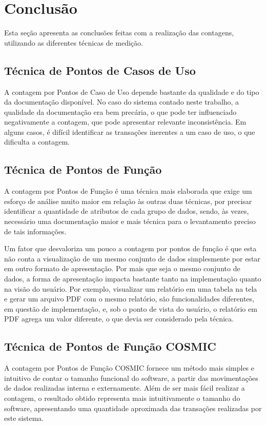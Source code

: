 \chapter{Conclusão}

  Esta seção apresenta as conclusões feitas com a realização das contagens, utilizando as diferentes técnicas de medição.

  \section{Técnica de Pontos de Casos de Uso}
      
    A contagem por Pontos de Caso de Uso depende bastante da qualidade e do tipo da documentação disponível.
    No caso do sistema contado neste trabalho, a qualidade da documentação era bem precária, o que pode 
    ter influenciado negativamente a contagem, que pode apresentar relevante inconsistência. Em alguns casos, é difícil 
    identificar as transações inerentes a um caso de uso, o que dificulta a contagem.
	
  \section{Técnica de Pontos de Função}
    
    A contagem por Pontos de Função é uma técnica mais elaborada que exige um esforço de análise muito maior em relação às outras duas 
    técnicas, por precisar identificar a quantidade de atributos de cada grupo de dados, sendo, às vezes, necessário uma documentação maior e mais técnica
    para o levantamento preciso de tais informações.
    
    Um fator que desvaloriza um pouco a contagem por pontos de função é que esta não conta a visualização de um mesmo 
    conjunto de dados simplesmente por estar em outro formato de apresentação. Por mais que seja o mesmo conjunto de dados, 
    a forma de apresentação impacta bastante tanto na implementação quanto na visão do usuário. Por exemplo, visualizar um relatório 
    em uma tabela na tela e gerar um arquivo PDF com o mesmo relatório, são funcionalidades diferentes, em questão de implementação, 
    e, sob o ponto de vista do usuário, o relatório em PDF agrega um valor diferente, o que devia ser considerado pela técnica.
	
  \section{Técnica de Pontos de Função COSMIC}
  
    A contagem por Pontos de Função COSMIC fornece um método mais simples e intuitivo de contar o tamanho funcional do software, 
    a partir das movimentações de dados realizadas interna e externamente. Além de ser mais fácil realizar a contagem, o resultado obtido 
    representa mais intuitivamente o tamanho do software, apresentando uma quantidade aproximada das transações realizadas por este sistema.
	